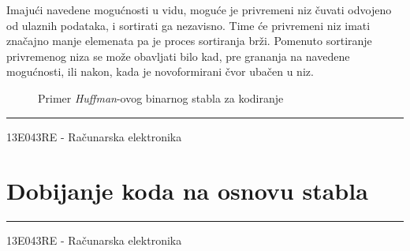 \documentclass[a4paper, 12pt]{article}
\newcommand{\btmline}{
\vfill
\rule{0.9\textwidth}{0.4mm}
\begin{center}
13E043RE - Računarska elektronika
\end{center}}
\begin{document}
Imajući navedene mogućnosti u vidu, moguće je privremeni niz čuvati odvojeno od ulaznih podataka, i sortirati ga nezavisno. Time će privremeni niz imati značajno manje elemenata pa je proces sortiranja brži. Pomenuto sortiranje privremenog niza se može obavljati bilo kad, pre grananja na navedene mogućnosti, ili nakon, kada je novoformirani čvor ubačen u niz.

\begin{figure}
\centering
{}
\caption{Primer \emph{Huffman}-ovog binarnog stabla za kodiranje}
\end{figure}

\btmline\newpage
\section*{Dobijanje koda na osnovu stabla}


\btmline\newpage
\end{document}
